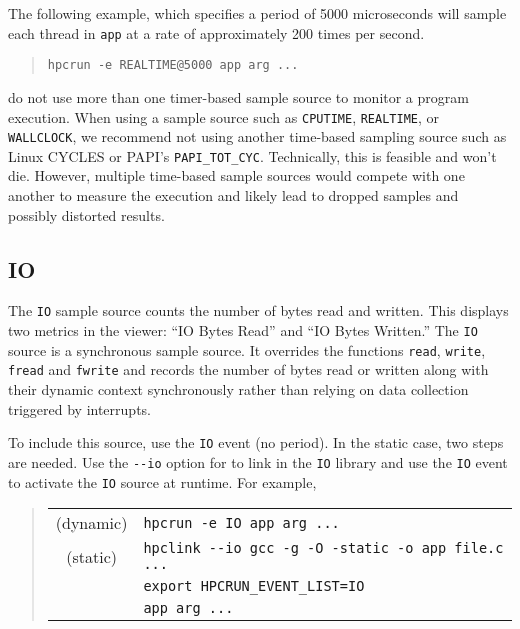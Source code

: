 The following example, which specifies a period of 5000 microseconds will sample
each thread in \verb|app| at a rate of approximately 200 times per second.

\begin{quote}
\begin{verbatim}
hpcrun -e REALTIME@5000 app arg ...
\end{verbatim}
\end{quote}


 do not use more than one timer-based sample source to monitor a program execution.
When using a sample source such as \verb|CPUTIME|, \verb|REALTIME|, or \verb|WALLCLOCK|,
we recommend not using another time-based sampling source such as 
Linux \perfevents{} CYCLES or PAPI's \verb|PAPI_TOT_CYC|. 
Technically, this is feasible and \hpcrun{} won't die.
However, multiple time-based sample sources would compete with one another to measure the
execution and likely lead to dropped samples and possibly distorted results.

\subsection{IO}

The \verb|IO| sample source counts the number of bytes read and
written.  This displays two metrics in the viewer: ``IO Bytes Read''
and ``IO Bytes Written.''  The \verb|IO| source is a synchronous sample
source.  
It overrides the functions \verb|read|, \verb|write|, \verb|fread|
and \verb|fwrite| and records the number of bytes read or
written along with their dynamic context synchronously rather 
than relying on data collection triggered by interrupts.

To include this source, use the \verb|IO| event (no period).  In the
static case, two steps are needed.  Use the \verb|--io| option for
\hpclink{} to link in the \verb|IO| library and use the \verb|IO| event
to activate the \verb|IO| source at runtime.  For example,

\begin{quote}
\begin{tabular}{@{}cl}
(dynamic) & \verb|hpcrun -e IO app arg ...| \\
(static)  & \verb|hpclink --io gcc -g -O -static -o app file.c ...| \\
& \verb|export HPCRUN_EVENT_LIST=IO| \\
& \verb|app arg ...|
\end{tabular}
\end{quote}

